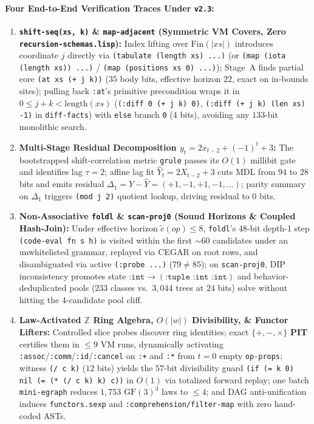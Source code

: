 \documentclass[12pt]{article}
\begin{document}
\paragraph{Four End-to-End Verification Traces Under \texttt{v2.3}:}
\begin{enumerate}[leftmargin=1.6em, itemsep=0.18em]
  \item \textbf{\texttt{shift-seq(xs, k)} \& \texttt{map-\allowbreak adjacent} (Symmetric VM Covers, Zero \texttt{recursion\allowbreak-schemas.\allowbreak lisp}):} Index lifting over $\mathrm{Fin}(|xs|)$ introduces coordinate $j$ directly via \texttt{(tabulate (length xs) ...)} (or \texttt{(map (iota (length xs)) ...)} / \texttt{(map (positions xs 0) ...)}); Stage~A finds partial core \texttt{(at xs (+ j k))} ($35$ body bits, effective horizon $22$, exact on in-bounds sites); pulling back \texttt{:at}'s primitive precondition wraps it in $0 \le j+k < \mathrm{length}(xs)$ (\texttt{(:diff 0 (+ j k) 0)}, \texttt{(:diff (+ j k) (len xs) -1)} in \texttt{diff-facts}) with \texttt{else} branch \texttt{0} ($4$ bits), avoiding any $133$-bit monolithic search.
  \item \textbf{Multi-Stage Residual Decomposition $y_t = 2 x_{t-2} + (-1)^t + 3$:} The bootstrapped shift-correlation metric \texttt{grule} passes its $O(1)$ millibit gate and identifies lag $\tau=2$; affine lag fit $\hat{Y}_t = 2 X_{t-2} + 3$ cuts MDL from $94$ to $28$ bits and emits residual $\Delta_1 = Y - \hat{Y} = (+1, -1, +1, -1, \dots)$; parity summary on $\Delta_1$ triggers \texttt{(mod j 2)} quotient lookup, driving residual to $0$ bits.
  \item \textbf{Non-Associative \texttt{foldl} \& \texttt{scan-proj0} (Sound Horizons \& Coupled Hash-Join):} Under effective horizon $\tilde{c}(op)\le 8$, \texttt{foldl}'s $48$-bit depth-1 step \texttt{(code-eval fn s h)} is visited within the first $\sim 60$ candidates under an unwhitelisted grammar, replayed via CEGAR on root rows, and disambiguated via active \texttt{(:probe ...)} ($79 \ne 85$); on \texttt{scan-proj0}, DIP inconsistency promotes state $\texttt{:int} \to (\texttt{:tuple :int :int})$ and behavior-deduplicated pools ($233$ classes vs.\ $3,044$ trees at $24$ bits) solve without hitting the $4$-candidate pool cliff.
  \item \textbf{Law-Activated $\mathbb{Z}$ Ring Algebra, $O(|w|)$ Divisibility, \& Functor Lifters:} Controlled slice probes discover ring identities; exact $\{+,-,\times\}$ \textbf{PIT} certifies them in $\le 9$ VM runs, dynamically activating \texttt{:assoc}/\texttt{:comm}/\texttt{:id}/\texttt{:cancel} on \texttt{:+} and \texttt{:*} from $t=0$ empty \texttt{op-props}; witness \texttt{(/ c k)} ($12$ bits) yields the $57$-bit divisibility guard \texttt{(if (= k 0) nil (= (* (/ c k) k) c))} in $O(1)$ via totalized forward replay; one batch \texttt{mini-egraph} reduces $1,753$ $\mathrm{GF}(3)^3$ laws to $\le 4$; and DAG anti-unification induces \texttt{functors.sexp} and \texttt{:comprehension/filter-map} with zero hand-coded ASTs.
\end{enumerate}
\end{document}

